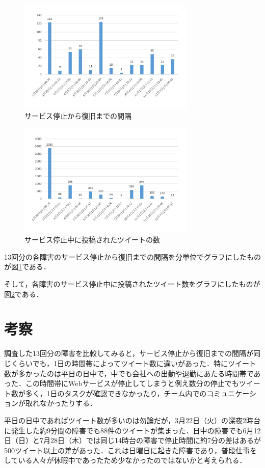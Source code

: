 \documentclass[uplatex,twocolumn]{jsarticle}
\begin{document}
\begin{figure}[H]
\includegraphics[width=8.4cm,clip]{graph1.pdf}
\caption{サービス停止から復旧までの間隔}\label{時間}
\end{figure}
\begin{figure}[H]
\includegraphics[width=8.4cm,clip]{graph2.pdf}
\caption{サービス停止中に投稿されたツイートの数}\label{ツイート数}
\end{figure}
13回分の各障害のサービス停止から復旧までの間隔を分単位でグラフにしたものが図\ref{時間}である．

そして，各障害のサービス停止中に投稿されたツイート数をグラフにしたものが図\ref{ツイート数}である．

\section{考察}
調査した13回分の障害を比較してみると，サービス停止から復旧までの間隔が同じくらいでも，1日の時間帯によってツイート数に違いがあった．特にツイート数が多かったのは平日の日中で，中でも会社への出勤や退勤にあたる時間帯であった．この時間帯にWebサービスが停止してしまうと例え数分の停止でもツイート数が多く，1日のタスクが確認できなかったり，チーム内でのコミュニケーションが取れなかったりする．

平日の日中であればツイート数が多いのは勿論だが，3月22日（火）の深夜2時台に発生した約9分間の障害でも88件のツイートが集まった．日中の障害でも6月12日（日）と7月28日（木）では同じ14時台の障害で停止時間に約7分の差はあるが500ツイート以上の差があった．これは日曜日に起きた障害であり，普段仕事をしている人々が休暇中であったため少なかったのではないかと考えられる．
\end{document}
